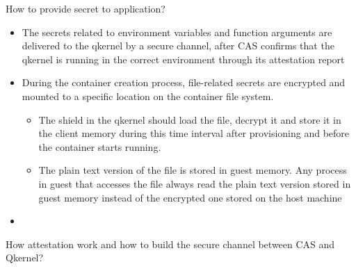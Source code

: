 How to provide secret to application?
\begin{itemize}
    \item  The secrets related to environment variables and function arguments are  delivered to the qkernel by a secure channel, after CAS confirms that the qkernel is running in the correct environment through its attestation report
    \item  During the container creation process, file-related secrets are encrypted and mounted to a specific location on the container file system.
    \begin{itemize}
        \item The shield in the qkernel should load the file, decrypt it and store it in the client memory during this time interval after provisioning and before the container starts running.
        \item The plain text version of the file is stored in guest memory. Any process in guest that accesses the file always read the plain text version stored in guest memory instead of the encrypted one stored on the host machine
      \end{itemize}
    \item
\end{itemize}

How attestation work and how to build the secure channel between CAS and Qkernel?


\cleardoublepage

